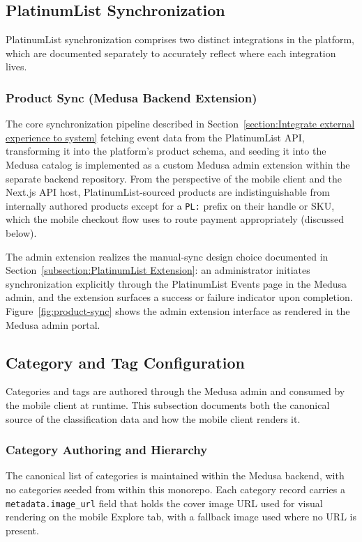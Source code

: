 \subsection{PlatinumList Synchronization}
\label{subsection:PlatinumList Synchronization}
PlatinumList synchronization comprises two distinct integrations in the platform, which are documented separately to accurately reflect where each integration lives.

\subsubsection{Product Sync (Medusa Backend Extension)}
The core synchronization pipeline described in Section~\ref{section:Integrate external experience to system} fetching event data from the PlatinumList API, transforming it into the platform's product schema, and seeding it into the Medusa catalog is implemented as a custom Medusa admin extension within the separate backend repository. From the perspective of the mobile client and the Next.js API host, PlatinumList-sourced products are indistinguishable from internally authored products except for a \texttt{PL:} prefix on their handle or SKU, which the mobile checkout flow uses to route payment appropriately (discussed below).

The admin extension realizes the manual-sync design choice documented in Section~\ref{subsection:PlatinumList Extension}: an administrator initiates synchronization explicitly through the PlatinumList Events page in the Medusa admin, and the extension surfaces a success or failure indicator upon completion. Figure~\ref{fig:product-sync} shows the admin extension interface as rendered in the Medusa admin portal.


\subsection{Category and Tag Configuration}
Categories and tags are authored through the Medusa admin and consumed by the mobile client at runtime. This subsection documents both the canonical source of the classification data and how the mobile client renders it.

\subsubsection{Category Authoring and Hierarchy}
The canonical list of categories is maintained within the Medusa backend, with no categories seeded from within this monorepo. Each category record carries a \texttt{metadata.image\_url} field that holds the cover image URL used for visual rendering on the mobile Explore tab, with a fallback image used where no URL is present.

